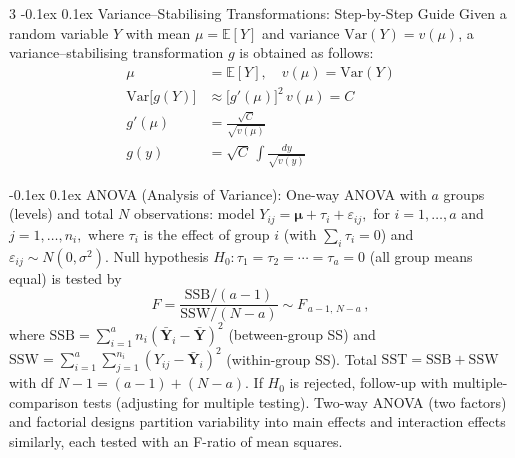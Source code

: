 \documentclass[10pt]{article}
\makeatletter
\renewcommand{\section}{\@startsection{section}{1}{0mm}
  {-0.1ex}%
  {0.1ex}%
  {\normalfont\normalsize\bfseries\color{thm-color}}}
\newcommand{\vect}[1]{\symbf{#1}} %
\makeatother
\begin{document}
\begin{multicols}{3}
  \section{Variance--Stabilising Transformations: Step-by-Step Guide}
  Given a random variable $Y$ with mean $\mu=\mathbb{E}[Y]$ and variance $\mathrm{Var}(Y)=v(\mu)$, a variance–stabilising transformation $g$ is obtained as follows:
  \begin{align}
    \mu                          & = \mathbb{E}[Y], \quad v(\mu) = \mathrm{Var}(Y) \\
    \mathrm{Var}\bigl[g(Y)\bigr] & \approx \bigl[g'(\mu)\bigr]^2 \,v(\mu) = C      \\
    g'(\mu)                      & = \frac{\sqrt{C}}{\sqrt{v(\mu)}}                \\
    g(y)                         & = \sqrt{C}\,\int \frac{dy}{\sqrt{v(y)}}
  \end{align}

  \section{ANOVA (Analysis of Variance):}
  One-way ANOVA with \( a \) groups (levels) and total \( N \) observations: model \( Y_{ij} = \vect{\mu} + \tau_i + \varepsilon_{ij}, \) for \( i=1,\dots,a \) and \( j=1,\dots,n_i, \) where \( \tau_i \) is the effect of group \( i \) (with \( \sum_i \tau_i=0 \)) and \( \varepsilon_{ij}\sim N(0,\sigma^2). \)
  Null hypothesis \( H_0: \tau_1=\tau_2=\cdots=\tau_a=0 \) (all group means equal) is tested by
  \[ F = \frac{\mathrm{SSB}/(a-1)}{\mathrm{SSW}/(N-a)} \sim F_{\,a-1,\,N-a}\,, \]
  where \( \mathrm{SSB}=\sum_{i=1}^a n_i (\bar{\vect{Y}}_i - \bar{\vect{Y}})^2 \) (between-group SS) and \( \mathrm{SSW}=\sum_{i=1}^a\sum_{j=1}^{n_i}(Y_{ij}-\bar{\vect{Y}}_i)^2 \) (within-group SS).
  Total \( \mathrm{SST}=\mathrm{SSB}+\mathrm{SSW} \) with df \( N-1=(a-1)+(N-a). \)
  If \( H_0 \) is rejected, follow-up with multiple-comparison tests (adjusting for multiple testing).
  Two-way ANOVA (two factors) and factorial designs partition variability into main effects and interaction effects similarly, each tested with an F-ratio of mean squares.


\end{multicols}
\end{document}
